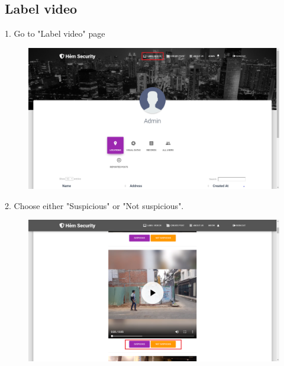 \subsection{Label video}
1. Go to "Label video" page
\begin{center}
    \begin{figure}[H]
    \centering
    \includegraphics[width=1\columnwidth]{images/chap6/instruction5.png}
    \end{figure}
\end{center}
2. Choose either "Suspicious" or "Not suspicious". 
\begin{center}
    \begin{figure}[H]
    \centering
    \includegraphics[width=1\columnwidth]{images/chap6/instruction6.png}
    \end{figure}
\end{center}
